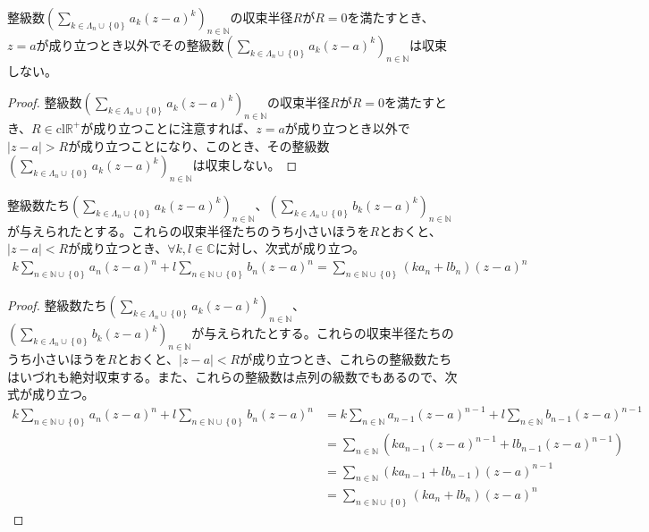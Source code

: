 \documentclass[dvipdfmx]{jsarticle}
\begin{document}
\begin{thm}\label{4.1.13.5}
整級数$\left( \sum_{k \in \varLambda_{n} \cup \left\{ 0 \right\}} {a_{k}(z - a)^{k}} \right)_{n \in \mathbb{N}}$の収束半径$R$が$R = 0$を満たすとき、$z = a$が成り立つとき以外でその整級数$\left( \sum_{k \in \varLambda_{n} \cup \left\{ 0 \right\}} {a_{k}(z - a)^{k}} \right)_{n \in \mathbb{N}}$は収束しない。
\end{thm}
\begin{proof}
整級数$\left( \sum_{k \in \varLambda_{n} \cup \left\{ 0 \right\}} {a_{k}(z - a)^{k}} \right)_{n \in \mathbb{N}}$の収束半径$R$が$R = 0$を満たすとき、$R \in \mathrm{cl}\mathbb{R}^{+}$が成り立つことに注意すれば、$z = a$が成り立つとき以外で$|z - a| > R$が成り立つことになり、このとき、その整級数$\left( \sum_{k \in \varLambda_{n} \cup \left\{ 0 \right\}} {a_{k}(z - a)^{k}} \right)_{n \in \mathbb{N}}$は収束しない。
\end{proof}
\begin{thm}\label{4.1.13.6}
整級数たち$\left( \sum_{k \in \varLambda_{n} \cup \left\{ 0 \right\}} {a_{k}(z - a)^{k}} \right)_{n \in \mathbb{N}}$、$\left( \sum_{k \in \varLambda_{n} \cup \left\{ 0 \right\}} {b_{k}(z - a)^{k}} \right)_{n \in \mathbb{N}}$が与えられたとする。これらの収束半径たちのうち小さいほうを$R$とおくと、$|z - a| < R$が成り立つとき、$\forall k,l \in \mathbb{C}$に対し、次式が成り立つ。
\begin{align*}
k\sum_{n \in \mathbb{N} \cup \left\{ 0 \right\}} {a_{n}(z - a)^{n}} + l\sum_{n \in \mathbb{N} \cup \left\{ 0 \right\}} {b_{n}(z - a)^{n}} = \sum_{n \in \mathbb{N} \cup \left\{ 0 \right\}} {\left( ka_{n} + lb_{n} \right)(z - a)^{n}}
\end{align*}
\end{thm}
\begin{proof}
整級数たち$\left( \sum_{k \in \varLambda_{n} \cup \left\{ 0 \right\}} {a_{k}(z - a)^{k}} \right)_{n \in \mathbb{N}}$、$\left( \sum_{k \in \varLambda_{n} \cup \left\{ 0 \right\}} {b_{k}(z - a)^{k}} \right)_{n \in \mathbb{N}}$が与えられたとする。これらの収束半径たちのうち小さいほうを$R$とおくと、$|z - a| < R$が成り立つとき、これらの整級数たちはいづれも絶対収束する。また、これらの整級数は点列の級数でもあるので、次式が成り立つ。
\begin{align*}
k\sum_{n \in \mathbb{N} \cup \left\{ 0 \right\}} {a_{n}(z - a)^{n}} + l\sum_{n \in \mathbb{N} \cup \left\{ 0 \right\}} {b_{n}(z - a)^{n}} &= k\sum_{n \in \mathbb{N}} {a_{n - 1}(z - a)^{n - 1}} + l\sum_{n \in \mathbb{N}} {b_{n - 1}(z - a)^{n - 1}}\\
&= \sum_{n \in \mathbb{N}} \left( ka_{n - 1}(z - a)^{n - 1} + lb_{n - 1}(z - a)^{n - 1} \right)\\
&= \sum_{n \in \mathbb{N}} {\left( ka_{n - 1} + lb_{n - 1} \right)(z - a)^{n - 1}}\\
&= \sum_{n \in \mathbb{N} \cup \left\{ 0 \right\}} {\left( ka_{n} + lb_{n} \right)(z - a)^{n}}
\end{align*}
\end{proof}
\end{document}
